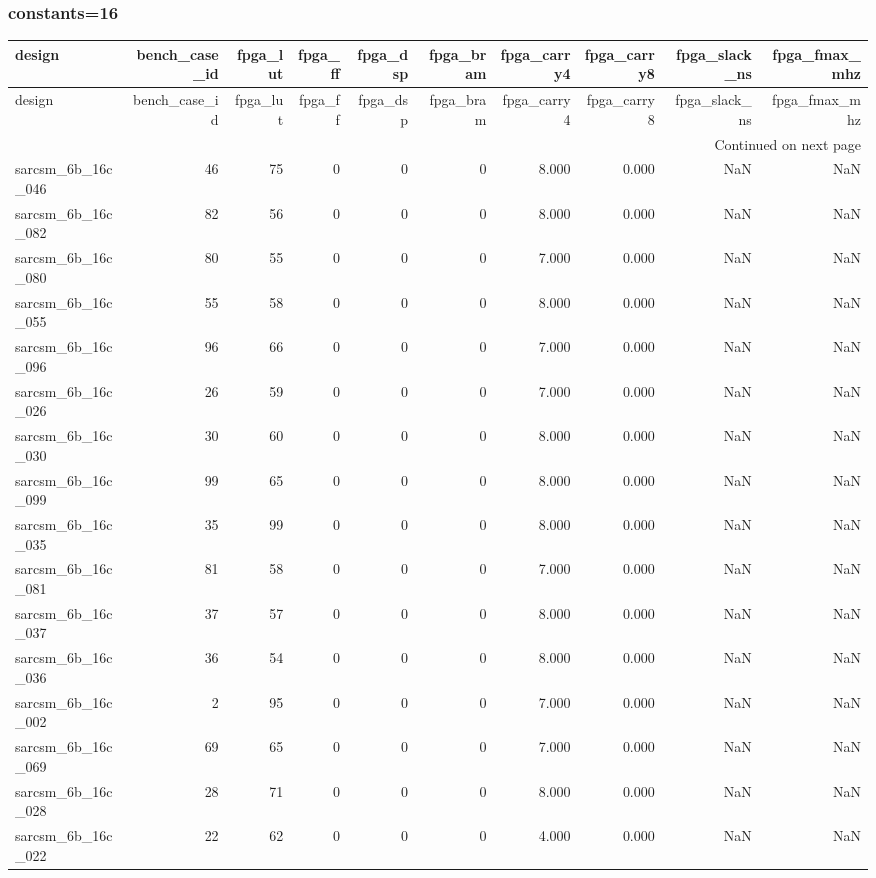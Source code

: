 \documentclass{article}
\begin{document}
\subsubsection*{constants=16}
\begin{longtable}{lrrrrrrrrr}
\toprule
design & bench\_case\_id & fpga\_lut & fpga\_ff & fpga\_dsp & fpga\_bram & fpga\_carry4 & fpga\_carry8 & fpga\_slack\_ns & fpga\_fmax\_mhz \\
\midrule
\endfirsthead
\toprule
design & bench\_case\_id & fpga\_lut & fpga\_ff & fpga\_dsp & fpga\_bram & fpga\_carry4 & fpga\_carry8 & fpga\_slack\_ns & fpga\_fmax\_mhz \\
\midrule
\endhead
\midrule
\multicolumn{10}{r}{Continued on next page} \\
\midrule
\endfoot
\bottomrule
\endlastfoot
sarcsm\_6b\_16c\_046 & 46 & 75 & 0 & 0 & 0 & 8.000 & 0.000 & NaN & NaN \\
sarcsm\_6b\_16c\_082 & 82 & 56 & 0 & 0 & 0 & 8.000 & 0.000 & NaN & NaN \\
sarcsm\_6b\_16c\_080 & 80 & 55 & 0 & 0 & 0 & 7.000 & 0.000 & NaN & NaN \\
sarcsm\_6b\_16c\_055 & 55 & 58 & 0 & 0 & 0 & 8.000 & 0.000 & NaN & NaN \\
sarcsm\_6b\_16c\_096 & 96 & 66 & 0 & 0 & 0 & 7.000 & 0.000 & NaN & NaN \\
sarcsm\_6b\_16c\_026 & 26 & 59 & 0 & 0 & 0 & 7.000 & 0.000 & NaN & NaN \\
sarcsm\_6b\_16c\_030 & 30 & 60 & 0 & 0 & 0 & 8.000 & 0.000 & NaN & NaN \\
sarcsm\_6b\_16c\_099 & 99 & 65 & 0 & 0 & 0 & 8.000 & 0.000 & NaN & NaN \\
sarcsm\_6b\_16c\_035 & 35 & 99 & 0 & 0 & 0 & 8.000 & 0.000 & NaN & NaN \\
sarcsm\_6b\_16c\_081 & 81 & 58 & 0 & 0 & 0 & 7.000 & 0.000 & NaN & NaN \\
sarcsm\_6b\_16c\_037 & 37 & 57 & 0 & 0 & 0 & 8.000 & 0.000 & NaN & NaN \\
sarcsm\_6b\_16c\_036 & 36 & 54 & 0 & 0 & 0 & 8.000 & 0.000 & NaN & NaN \\
sarcsm\_6b\_16c\_002 & 2 & 95 & 0 & 0 & 0 & 7.000 & 0.000 & NaN & NaN \\
sarcsm\_6b\_16c\_069 & 69 & 65 & 0 & 0 & 0 & 7.000 & 0.000 & NaN & NaN \\
sarcsm\_6b\_16c\_028 & 28 & 71 & 0 & 0 & 0 & 8.000 & 0.000 & NaN & NaN \\
sarcsm\_6b\_16c\_022 & 22 & 62 & 0 & 0 & 0 & 4.000 & 0.000 & NaN & NaN \\

\end{longtable}
\end{document}
